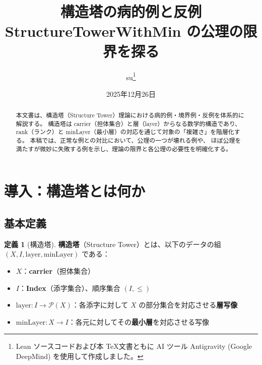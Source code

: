 \documentclass[a4paper,11pt]{ltjsarticle}
\title{%
    \textbf{構造塔の病的例と反例}\\[0.5em]
    \Large StructureTowerWithMin の公理の限界を探る
}
\author{su\thanks{Lean ソースコードおよび本 \TeX 文書ともに AI ツール Antigravity (Google DeepMind) を使用して作成しました。}}
\date{2025年12月26日}
\theoremstyle{definition}
\newtheorem{definition}{定義}[section]
\theoremstyle{plain}
\theoremstyle{remark}
\newcommand{\Layer}{\mathrm{layer}}
\newcommand{\minLayer}{\mathrm{minLayer}}
\begin{document}
\maketitle

\begin{abstract}
本文書は、構造塔（Structure Tower）理論における病的例・境界例・反例を体系的に解説する。
構造塔は carrier（担体集合）と層（layer）からなる数学的構造であり、
rank（ランク）と minLayer（最小層）の対応を通じて対象の「複雑さ」を階層化する。
本稿では、正常な例との対比において、公理の一つが壊れる例や、
ほぼ公理を満たすが微妙に失敗する例を示し、理論の限界と各公理の必要性を明確化する。
\end{abstract}

\tableofcontents

\newpage

\section{導入：構造塔とは何か}

\subsection{基本定義}

\begin{definition}[構造塔]
\textbf{構造塔}（Structure Tower）とは、以下のデータの組 $(X, I, \Layer, \minLayer)$ である：
\begin{itemize}
    \item $X$：\textbf{carrier}（担体集合）
    \item $I$：\textbf{Index}（添字集合）、順序集合 $(I, \leq)$
    \item $\Layer : I \to \mathcal{P}(X)$：各添字に対して $X$ の部分集合を対応させる\textbf{層写像}
    \item $\minLayer : X \to I$：各元に対してその\textbf{最小層}を対応させる写像
\end{itemize}
\end{definition}
\end{document}
